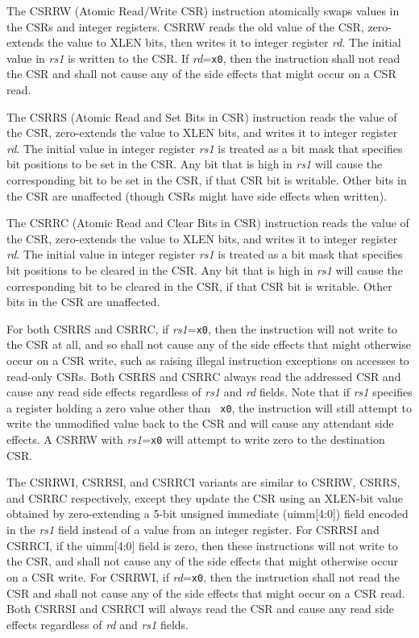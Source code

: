 The CSRRW (Atomic Read/Write CSR) instruction atomically swaps values
in the CSRs and integer registers. CSRRW reads the old value of the
CSR, zero-extends the value to XLEN bits, then writes it to integer
register {\em rd}.  The initial value in {\em rs1} is written to the
CSR.  If {\em rd}={\tt x0}, then the instruction shall not read the CSR
and shall not cause any of the side effects that might occur on a CSR
read.

The CSRRS (Atomic Read and Set Bits in CSR) instruction reads the
value of the CSR, zero-extends the value to XLEN bits, and writes it
to integer register {\em rd}.  The initial value in integer register
{\em rs1} is treated as a bit mask that specifies bit positions to be
set in the CSR.  Any bit that is high in {\em rs1} will cause the
corresponding bit to be set in the CSR, if that CSR bit is writable.
Other bits in the CSR are unaffected (though CSRs might have side
effects when written).

The CSRRC (Atomic Read and Clear Bits in CSR) instruction reads the
value of the CSR, zero-extends the value to XLEN bits, and writes it
to integer register {\em rd}.  The initial value in integer register
{\em rs1} is treated as a bit mask that specifies bit positions to be
cleared in the CSR.  Any bit that is high in {\em rs1} will cause the
corresponding bit to be cleared in the CSR, if that CSR bit is
writable.  Other bits in the CSR are unaffected.

For both CSRRS and CSRRC, if {\em rs1}={\tt x0}, then the instruction
will not write to the CSR at all, and so shall not cause any of the
side effects that might otherwise occur on a CSR write, such as
raising illegal instruction exceptions on accesses to read-only CSRs.
Both CSRRS and CSRRC always read the addressed CSR and cause any read
side effects regardless of {\em rs1} and {\em rd} fields.  Note that
if {\em rs1} specifies a register holding a zero value other than {\tt
  x0}, the instruction will still attempt to write the unmodified
value back to the CSR and will cause any attendant side effects.  A
CSRRW with {\em rs1}={\tt x0} will attempt to write zero to the
destination CSR.

The CSRRWI, CSRRSI, and CSRRCI variants are similar to CSRRW, CSRRS,
and CSRRC respectively, except they update the CSR using an XLEN-bit
value obtained by zero-extending a 5-bit unsigned immediate (uimm[4:0]) field
encoded in the {\em rs1} field instead of a value from an integer
register.  For CSRRSI and CSRRCI, if the uimm[4:0] field is zero, then
these instructions will not write to the CSR, and shall not cause any
of the side effects that might otherwise occur on a CSR write.  For
CSRRWI, if {\em rd}={\tt x0}, then the instruction shall not read the
CSR and shall not cause any of the side effects that might occur on a
CSR read.  Both CSRRSI and CSRRCI will always read the CSR and cause
any read side effects regardless of {\em rd} and {\em rs1} fields.

